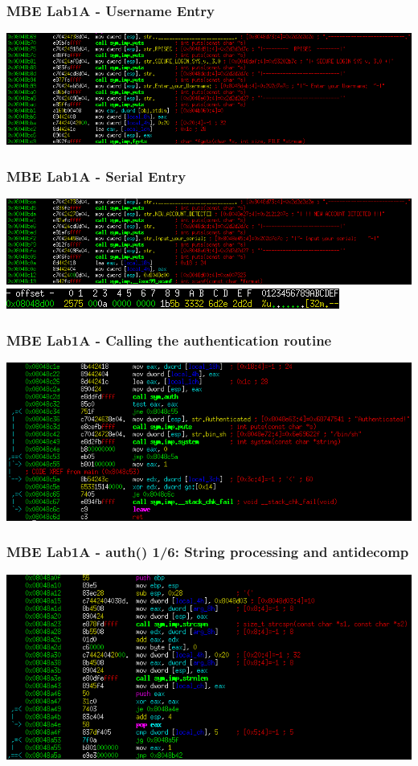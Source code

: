 \documentclass[aspectratio=169]{beamer}
\begin{document}
\begin{frame}[fragile]
\frametitle{MBE Lab1A - Username Entry}
\includegraphics[width=0.9\paperwidth]{pictures/intel/mbe_lab1a_username_entry.png}
\end{frame}

\begin{frame}[fragile]
\frametitle{MBE Lab1A - Serial Entry}
\includegraphics[width=0.9\paperwidth]{pictures/intel/mbe_lab1a_serial_entry.png}\\
\includegraphics[width=0.9\paperwidth]{pictures/mbe_lab1_scanf_arg_cropped.png}
\end{frame}

\begin{frame}[fragile]
\frametitle{MBE Lab1A - Calling the authentication routine}
\includegraphics[width=0.9\paperwidth]{pictures/intel/mbe_lab1a_call_auth.png}
\end{frame}

\begin{frame}[fragile]
\frametitle{MBE Lab1A - auth() 1/6: String processing and antidecomp}
\includegraphics[width=0.9\paperwidth]{pictures/intel/mbe_lab1a_auth_chunk1.png}
\end{frame}
\end{document}
